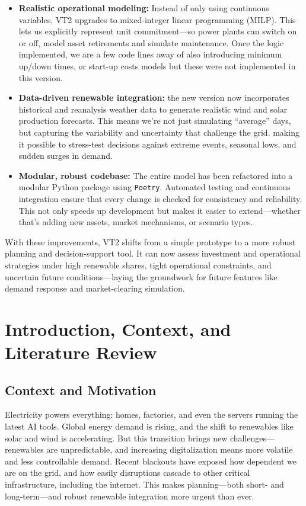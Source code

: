 \begin{itemize}
    \item \textbf{Realistic operational modeling:} Instead of only using 
    continuous variables, VT2 upgrades to mixed-integer linear programming (MILP). 
    This lets us explicitly represent unit commitment—so power plants can 
    switch on or off, model asset retirements and simulate maintenance.
    Once the logic implemented, we are a few code lines away of also introducing minimum up/down times, 
    or start-up costs models but these were not implemented in this version.
    \item \textbf{Data-driven renewable integration:} the new version now incorporates 
    historical and reanalysis weather data to generate realistic wind and 
    solar production forecasts. This means we’re not just simulating “average” 
    days, but capturing the variability and uncertainty that challenge the grid.
    making it possible to stress-test decisions against extreme events, 
    seasonal lows, and sudden surges in demand.
    \item \textbf{Modular, robust codebase:} The entire model has been 
    refactored into a modular Python package using \texttt{Poetry}. Automated 
    testing and continuous integration ensure that every change is checked for consistency and reliability. This not only speeds up development but makes it easier to extend—whether that’s adding new assets, market mechanisms, or scenario types.
\end{itemize}

With these improvements, VT2 shifts from a simple prototype to a more robust 
planning and decision-support tool. It can now assess investment and operational 
strategies under high renewable shares, tight operational constraints, and 
uncertain future conditions—laying the groundwork for future features like 
demand response and market-clearing simulation.

\newpage

\section{Introduction, Context, and Literature Review}
\label{sec:intro_lit}

\subsection{Context and Motivation}
Electricity powers everything: homes, factories, and even the servers running the latest AI tools. Global energy demand is rising, and the shift to renewables like solar and wind is accelerating. But this transition brings new challenges—renewables are unpredictable, and increasing digitalization means more volatile and less controllable demand. Recent blackouts have exposed how dependent we are on the grid, and how easily disruptions cascade to other critical infrastructure, including the internet. This makes planning—both short- and long-term—and robust renewable integration more urgent than ever.

